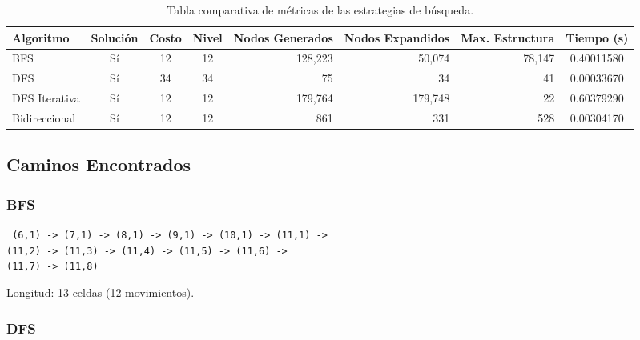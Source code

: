 \documentclass{article}
\begin{document}
\begin{table}[H]
\centering

\begin{adjustbox}{width=\textwidth}

\begin{tabular}{|l|c|c|c|r|r|r|c|}
\hline

\textbf{Algoritmo} &
\textbf{Solución} &
\textbf{Costo} &
\textbf{Nivel} &
\textbf{Nodos Generados} &
\textbf{Nodos Expandidos} &
\textbf{Max. Estructura} &
\textbf{Tiempo (s)}
\\ \hline

BFS &
Sí &
12 &
12 &
128,223 &
50,074 &
78,147 &
0.40011580
\\ \hline

DFS &
Sí &
34 &
34 &
75 &
34 &
41 &
0.00033670
\\ \hline

DFS Iterativa &
Sí &
12 &
12 &
179,764 &
179,748 &
22 &
0.60379290
\\ \hline

Bidireccional &
Sí &
12 &
12 &
861 &
331 &
528 &
0.00304170
\\ \hline

\end{tabular}

\end{adjustbox}

\caption{Tabla comparativa de métricas de las estrategias de búsqueda.}

\end{table}

\subsection{Caminos Encontrados}

\subsubsection{BFS}

\begin{flushleft}
\small
\texttt{
(6,1) -> (7,1) -> (8,1) -> (9,1) -> (10,1) -> (11,1) ->\\
(11,2) -> (11,3) -> (11,4) -> (11,5) -> (11,6) ->\\
(11,7) -> (11,8)
}
\end{flushleft}

Longitud: 13 celdas (12 movimientos).

\subsubsection{DFS}
\end{document}
